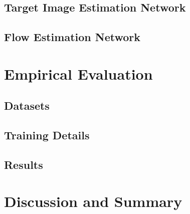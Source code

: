 \documentclass[10pt,twocolumn,letterpaper]{article}
\begin{document}
%
%

\subsection{Target Image Estimation Network}
\label{subsec: target image net}

\subsection{Flow Estimation Network}
\label{subsec: flow net}

\section{Empirical Evaluation}
\label{sec: evaluation}

\subsection{Datasets}

\subsection{Training Details}

\subsection{Results}

\section{Discussion and Summary}

{\small


}
\end{document}
